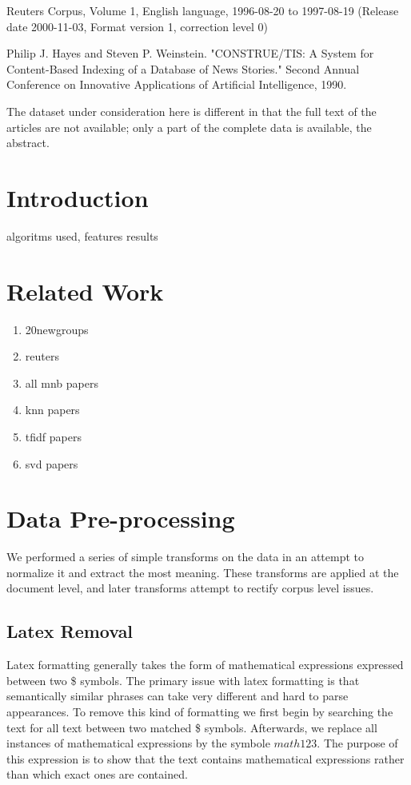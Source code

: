 \documentclass[10pt,twocolumn]{article}
\begin{document}
Reuters Corpus, Volume 1, English language, 1996-08-20 to 1997-08-19
(Release date 2000-11-03, Format version 1, correction level 0)

Philip J. Hayes and Steven P. Weinstein. "CONSTRUE/TIS: A System for Content-Based Indexing of a Database of News Stories." Second Annual Conference on Innovative Applications of Artificial Intelligence, 1990. 

The dataset under consideration here is different in that the full text of the articles are not available; only a part of the complete data is available, the abstract.

\section*{Introduction}

algoritms used, features results

\section* {Related Work}

\begin {enumerate}
\item 20newgroups
\item reuters
\item all mnb papers
\item knn papers
\item tfidf papers
\item svd papers
\end {enumerate}

\section*{Data Pre-processing}

We performed a series of simple transforms on the data in an attempt to normalize it and extract the most meaning. These transforms are applied at the document level, and later transforms attempt to rectify corpus level issues. 

\subsection*{Latex Removal}

Latex formatting generally takes the form of mathematical expressions expressed between two \$ symbols. The primary issue with latex formatting is that semantically similar phrases can take very different and hard to parse appearances. To remove this kind of formatting we first begin by searching the text for all text between two matched \$ symbols. Afterwards, we replace all instances of mathematical expressions by the symbole $math123$. The purpose of this expression is to show that the text contains mathematical expressions rather than which exact ones are contained. 
\end{document}

